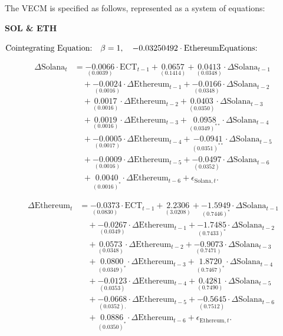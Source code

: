 \noindent The VECM is specified as follows, represented as a system of equations:\\

\begin{center}
    \textbf{SOL \& ETH}
\end{center}
$\text{Cointegrating Equation:} \quad  \beta = 1, \quad -0.03250492 \cdot \text{Ethereum} \\
\text{Equations:}$

\begin{align*}
\Delta \text{Solana}_t &= 
\underset{(0.0039)}{-0.0066} \cdot \text{ECT}_{t-1} + 
\underset{(0.1414)}{0.0657} + 
\underset{(0.0348)}{0.0413} \cdot \Delta \text{Solana}_{t-1} \\
&\quad + \underset{(0.0016)}{-0.0024} \cdot \Delta \text{Ethereum}_{t-1} + 
\underset{(0.0348)}{-0.0166} \cdot \Delta \text{Solana}_{t-2} \\
&\quad + \underset{(0.0016)}{0.0017} \cdot \Delta \text{Ethereum}_{t-2} + 
\underset{(0.0350)}{0.0403} \cdot \Delta \text{Solana}_{t-3} \\
&\quad + \underset{(0.0016)}{0.0019} \cdot \Delta \text{Ethereum}_{t-3} + 
\underset{(0.0349)^{**}}{0.0958} \cdot \Delta \text{Solana}_{t-4} \\
&\quad + \underset{(0.0017)}{-0.0005} \cdot \Delta \text{Ethereum}_{t-4} + 
\underset{(0.0351)^{**}}{-0.0941} \cdot \Delta \text{Solana}_{t-5} \\
&\quad + \underset{(0.0016)}{-0.0009} \cdot \Delta \text{Ethereum}_{t-5} + 
\underset{(0.0352)}{-0.0497} \cdot \Delta \text{Solana}_{t-6} \\
&\quad + \underset{(0.0016)^*}{0.0040} \cdot \Delta \text{Ethereum}_{t-6} + \epsilon_{\text{Solana},t}.
\end{align*}

\begin{align*}
\Delta \text{Ethereum}_t &= 
\underset{(0.0830)}{-0.0373} \cdot \text{ECT}_{t-1} + 
\underset{(3.0208)}{2.2306} + 
\underset{(0.7446)^*}{-1.5949} \cdot \Delta \text{Solana}_{t-1} \\
&\quad + \underset{(0.0349)}{-0.0267} \cdot \Delta \text{Ethereum}_{t-1} + 
\underset{(0.7433)^*}{-1.7485} \cdot \Delta \text{Solana}_{t-2} \\
&\quad + \underset{(0.0348)}{0.0573} \cdot \Delta \text{Ethereum}_{t-2} + 
\underset{(0.7471)}{-0.9073} \cdot \Delta \text{Solana}_{t-3} \\
&\quad + \underset{(0.0349)^*}{0.0800} \cdot \Delta \text{Ethereum}_{t-3} + 
\underset{(0.7467)^*}{1.8720} \cdot \Delta \text{Solana}_{t-4} \\
&\quad + \underset{(0.0353)}{-0.0123} \cdot \Delta \text{Ethereum}_{t-4} + 
\underset{(0.7490)}{0.4281} \cdot \Delta \text{Solana}_{t-5} \\
&\quad + \underset{(0.0352).}{-0.0668} \cdot \Delta \text{Ethereum}_{t-5} + 
\underset{(0.7512)}{-0.5645} \cdot \Delta \text{Solana}_{t-6} \\
&\quad + \underset{(0.0350)^*}{0.0886} \cdot \Delta \text{Ethereum}_{t-6} + \epsilon_{\text{Ethereum},t}.
\end{align*}


